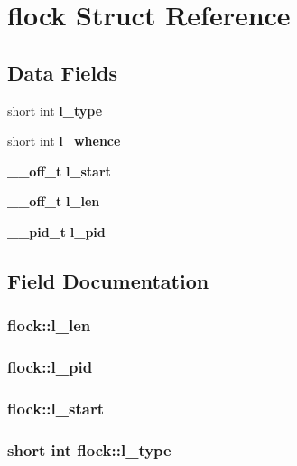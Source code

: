 \section{flock Struct Reference}
\label{structflock}
\subsection*{Data Fields}
\begin{DoxyCompactItemize}
\item 
short int {\bf l\_\-type}
\item 
short int {\bf l\_\-whence}
\item 
{\bf \_\-\_\-off\_\-t} {\bf l\_\-start}
\item 
{\bf \_\-\_\-off\_\-t} {\bf l\_\-len}
\item 
{\bf \_\-\_\-pid\_\-t} {\bf l\_\-pid}
\end{DoxyCompactItemize}


\subsection{Field Documentation}
\subsubsection[{l\_\-len}]{ {\bf flock::l\_\-len}}\label{structflock_a11880888eebb474dff955e2399653412}
\subsubsection[{l\_\-pid}]{ {\bf flock::l\_\-pid}}\label{structflock_aebc7059256c46d8154efe2adb9a8b883}
\subsubsection[{l\_\-start}]{ {\bf flock::l\_\-start}}\label{structflock_a41400d8ab148961123d22a29c7a6c269}
\subsubsection[{l\_\-type}]{\setlength{\rightskip}{0pt plus 5cm}short int {\bf flock::l\_\-type}}\label{structflock_a504cee7b604e5cd4f9eaa1346fc17672}
